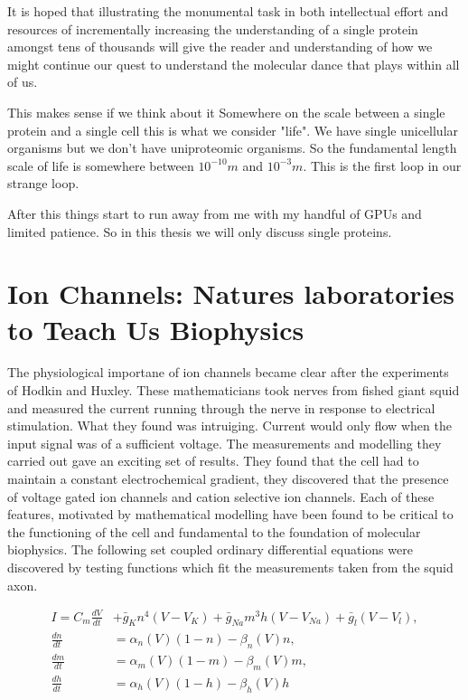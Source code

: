 It is hoped that illustrating the monumental task in both intellectual effort and resources of incrementally increasing the understanding of a single protein amongst tens of thousands will give the reader and understanding of how we might continue our quest to understand the molecular dance that plays within all of us.  
 
This makes sense if we think about it 
Somewhere on the scale between a single protein and a single cell this is what we consider "life". We have single unicellular organisms but we don't have uniproteomic organisms. So the fundamental length scale of life is somewhere between $10^{-10}m$ and $10^{-3}m$. This is the first loop in our strange loop.

After this things start to run away from me with my handful of GPUs and limited patience. So in this thesis we will only discuss single proteins.


\section{Ion Channels: Natures laboratories to Teach Us Biophysics}
The physiological importane of ion channels became clear after the experiments of Hodkin and Huxley. These mathematicians took nerves from fished giant squid and measured the current running through the nerve in response to electrical stimulation. What they found was intruiging. Current would only flow when the input signal was of a sufficient voltage. The measurements and modelling they carried out gave an exciting set of results. They found that the cell had to maintain a constant electrochemical gradient, they discovered that the presence of voltage gated ion channels and cation selective ion channels\cite{hodgkin1952}. Each of these features, motivated by mathematical modelling have been found to be critical to the functioning of the cell and fundamental to the foundation of molecular biophysics. The following set coupled ordinary differential equations were discovered by testing functions which fit the measurements taken from the squid axon.   

\begin{equation}
\begin{aligned}
	I = C_m \frac{dV}{dt} &+ \bar{g}_K n^4 (V - V_K) + \bar{g}_{Na} m^3 h (V - V_{Na} ) + \bar{g}_l (V-V_l) ,  \\
	\frac{dn}{dt} &= \alpha_n(V)  (1-n) - \beta_n(V)  n, \\
	\frac{dm}{dt} &= \alpha_m(V)  (1-m) - \beta_m(V)  m, \\ 
	\frac{dh}{dt} &= \alpha_h(V)  (1-h) - \beta_h(V)  h  
\end{aligned}
\end{equation}

